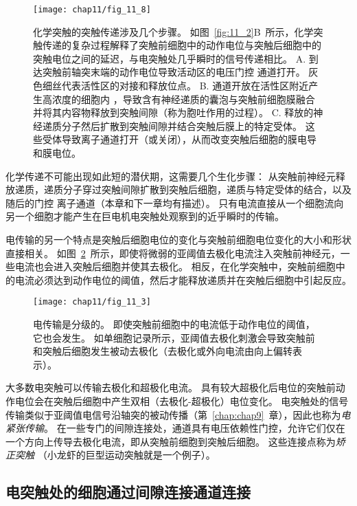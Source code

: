 \begin{figure}[htbp]
	\centering
	\texttt{[image: chap11/fig\_11\_8]}
	\caption{化学突触的突触传递涉及几个步骤。
		如图~\ref{fig:11_2}B~所示，化学突触传递的复杂过程解释了突触前细胞中的动作电位与突触后细胞中的突触电位之间的延迟，与电突触处几乎瞬时的信号传递相比。
		A. 到达突触前轴突末端的动作电位导致活动区的电压门控  通道打开。
		灰色细丝代表活性区的对接和释放位点。
		B.  通道开放在活性区附近产生高浓度的细胞内 ，导致含有神经递质的囊泡与突触前细胞膜融合并将其内容物释放到突触间隙（称为胞吐作用的过程）。
		C. 释放的神经递质分子然后扩散到突触间隙并结合突触后膜上的特定受体。
		这些受体导致离子通道打开（或关闭），从而改变突触后细胞的膜电导和膜电位。}
	\label{fig:11_8}
\end{figure}


化学传递不可能出现如此短的潜伏期，这需要几个生化步骤：
从突触前神经元释放递质，递质分子穿过突触间隙扩散到突触后细胞，递质与特定受体的结合，以及随后的门控 离子通道（本章和下一章均有描述）。
只有电流直接从一个细胞流向另一个细胞才能产生在巨电机电突触处观察到的近乎瞬时的传输。


电传输的另一个特点是突触后细胞电位的变化与突触前细胞电位变化的大小和形状直接相关。
如图~\ref{fig:11_3}~所示，即使将微弱的亚阈值去极化电流注入突触前神经元，一些电流也会进入突触后细胞并使其去极化。
相反，在化学突触中，突触前细胞中的电流必须达到动作电位的阈值，然后才能释放递质并在突触后细胞中引起反应。


\begin{figure}[htbp]
	\centering
	\texttt{[image: chap11/fig\_11\_3]}
	\caption{电传输是分级的。
		即使突触前细胞中的电流低于动作电位的阈值，它也会发生。
		如单细胞记录所示，亚阈值去极化刺激会导致突触前和突触后细胞发生被动去极化（去极化或外向电流由向上偏转表示）。}
	\label{fig:11_3}
\end{figure}


大多数电突触可以传输去极化和超极化电流。
具有较大超极化后电位的突触前动作电位会在突触后细胞中产生双相（去极化-超极化）电位变化。
电突触处的信号传输类似于亚阈值电信号沿轴突的被动传播（第~\ref{chap:chap9}~章），因此也称为\textit{电紧张传输}。
在一些专门的间隙连接处，通道具有电压依赖性门控，允许它们仅在一个方向上传导去极化电流，即从突触前细胞到突触后细胞。
这些连接点称为\textit{矫正突触}
（小龙虾的巨型运动突触就是一个例子）。



\subsection{电突触处的细胞通过间隙连接通道连接}

